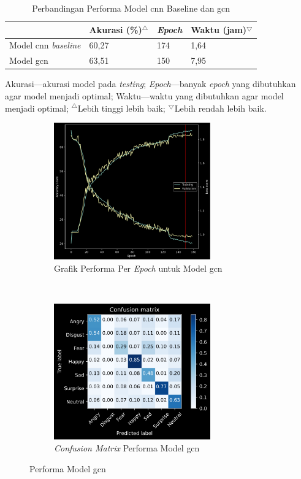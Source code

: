 \begin{table}[!t]
    \caption[Perbandingan Performa Model \acrshort{cnn} \textit{Baseline} dan \acrshort{gcn}]{Perbandingan Performa Model \acrshort{cnn} Baseline dan \acrshort{gcn}}
    \label{tab:eksperimengcn}
    \begin{tabular}{|L{5.4cm}|C{2.6cm}|C{1.5cm}|C{2.7cm}|}
        \hline
        & Akurasi (\%)$^\bigtriangleup$ & \textit{Epoch} & Waktu (jam)$^\bigtriangledown$ \\
        \hline\hline
        Model \acrshort{cnn} \textit{baseline} & 60,27 & 174 & 1,64 \\
        \hline
        Model \acrshort{gcn} & 63,51 & 150 & 7,95 \\
        \hline
    \end{tabular}
    \footnotesize
    {\raggedright Akurasi---akurasi model pada \textit{testing}; \textit{Epoch}---banyak \textit{epoch} yang dibutuhkan agar model menjadi optimal; Waktu---waktu yang dibutuhkan agar model menjadi optimal; $^\bigtriangleup$Lebih tinggi lebih baik; $^\bigtriangledown$Lebih rendah lebih baik.}
\end{table}
\begin{figure}[ht]
    \centering
    \begin{subfigure}[t]{6.75cm}
        \includegraphics[width=6.75cm]{gambar/eksperimen3_grafik1.png}
        \caption{Grafik Performa Per \textit{Epoch} untuk Model \acrshort{gcn}}
        \label{fig:grafikeksperimen3}
    \end{subfigure}
    ~~~
    \begin{subfigure}[t]{6.75cm}
        \includegraphics[width=6.75cm]{gambar/eksperimen2_matriks1.png}
        \caption{\textit{Confusion Matrix} Performa Model \acrshort{gcn}}
        \label{fig:confusionmatrixeksperimen3}
    \end{subfigure}
    \caption{Performa Model \acrshort{gcn}}
    \label{fig:hasileksperimen3}
\end{figure}
